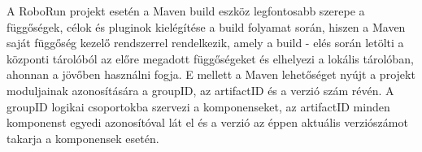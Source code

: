 	A RoboRun projekt esetén a Maven build eszköz legfontosabb szerepe a függőségek, célok és pluginok kielégítése a build folyamat során, hiszen a Maven saját függőség kezelő rendszerrel rendelkezik, amely  a build - elés során letölti a központi tárolóból az előre megadott függőségeket és elhelyezi a lokális tárolóban, ahonnan a jövőben használni fogja. E mellett a Maven lehetőséget nyújt a projekt moduljainak azonosítására a groupID, az artifactID és a verzió szám révén. A groupID logikai csoportokba szervezi a komponenseket, az artifactID minden komponenst egyedi azonosítóval lát el és a verzió az éppen aktuális verziószámot takarja a komponensek esetén.

